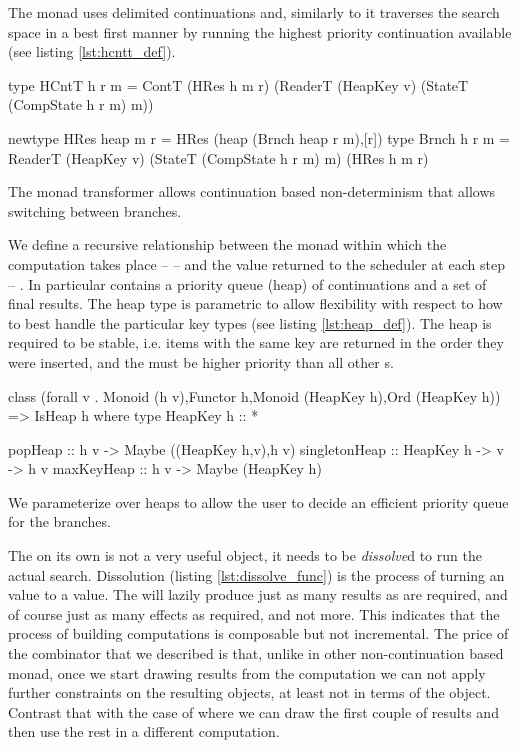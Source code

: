The  monad uses delimited continuations and, similarly to \cite{kidneyAlgebrasWeightedSearch2021} 
it traverses the search space in a best first manner by running the 
highest priority continuation available (see listing \ref{lst:hcntt_def}).

\begin{code}
\begin{haskellcode}
type HCntT h r m = ContT (HRes h m r)
  (ReaderT (HeapKey v)
   (StateT (CompState h r m) m))

newtype HRes heap m r = HRes (heap (Brnch heap r m),[r])
type Brnch h r m = ReaderT (HeapKey v)
  (StateT (CompState h r m) m) (HRes h m r)
\end{haskellcode}

  \caption{\label{lst:hcntt_def} The  monad transformer
    allows continuation based non-determinism that allows switching
    between branches.}
\end{code}

We define a recursive relationship between the monad within which the computation
takes place -- -- and the value returned to the scheduler at 
each step -- . In particular  contains a priority queue
(heap) of continuations and a set of final results. The heap type is parametric to allow
flexibility with respect to how to best handle the particular key
types (see listing \ref{lst:heap_def}). The heap is required to be stable,
i.e. items with the same key are returned in the order they were
inserted, and the   must be higher priority than all
other s.

\begin{code}
\begin{haskellcode}
class (forall v . Monoid (h v),Functor h,Monoid (HeapKey h),Ord (HeapKey h))
  => IsHeap h where
  type HeapKey h :: *

  popHeap :: h v -> Maybe ((HeapKey h,v),h v)
  singletonHeap :: HeapKey h -> v -> h v
  maxKeyHeap :: h v -> Maybe (HeapKey h)
\end{haskellcode}

  \caption{\label{lst:heap_def} We parameterize over heaps to allow
    the user to decide an efficient priority queue for the branches.}
\end{code}

The  on its own is not a very useful object, it needs to
be \emph{dissolve}d to run the actual search. Dissolution (listing
\ref{lst:dissolve_func}) is the process of turning an  value to a
 value. The  will lazily produce just as many
results as are required, and of course just as many effects as
required, and not more. This indicates that the process of building
computations is composable but not incremental. The price of the
\hask{<//>} combinator that we described is that, unlike in other
non-continuation based monad, once we start drawing results from the
computation we can not apply further constraints on the resulting
objects, at least not in terms of the  object.
Contrast that with the case of  where we can draw
the first couple of results and then use the rest in a different
computation.

